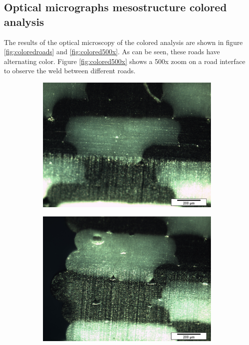 \subsection{Optical micrographs mesostructure colored analysis}

The results of the optical microscopy of the colored analysis are shown in figure \ref{fig:coloredroads} and \ref{fig:colored500x}. As can be seen, these roads have alternating color. Figure \ref{fig:colored500x} shows a 500x zoom on a road interface to observe the weld between different roads.
 
\begin{figure}[htb]
\centering
  \begin{subfigure}[b]{0.48\textwidth}
    \includegraphics[width=\textwidth]{chapter_4_RVE_Definition/figures/colored/Tv35_LI.jpg}
    \caption{}
    \label{fig:coloredroads_a}
  \end{subfigure}
  \begin{subfigure}[b]{0.48\textwidth}
    \includegraphics[width=\textwidth]{chapter_4_RVE_Definition/figures/colored/Tv38_LI.jpg}

\end{subfigure}
\end{figure}
